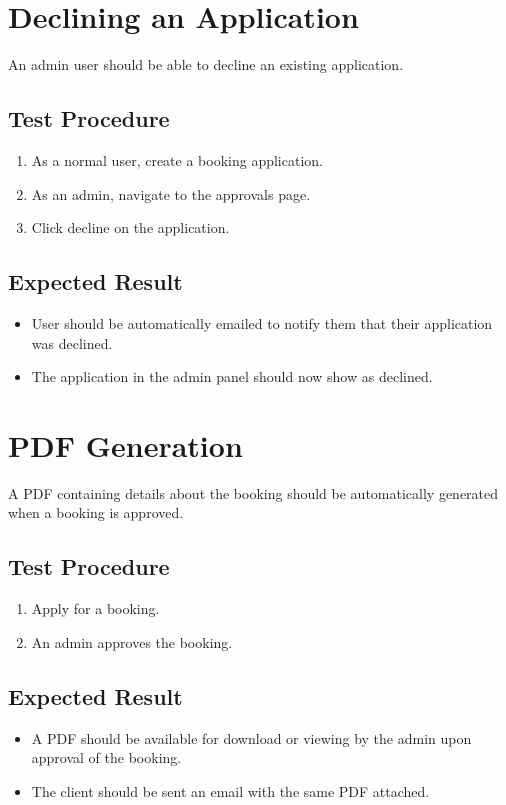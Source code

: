 \documentclass[a4paper, draft]{article}
\begin{document}
\section{Declining an Application}
An admin user should be able to decline an existing application.

\subsection{Test Procedure}
\begin{enumerate}
    \item As a normal user, create a booking application.
    \item As an admin, navigate to the approvals page.
    \item Click decline on the application.
\end{enumerate}

\subsection{Expected Result}
\begin{itemize}
    \item User should be automatically emailed to notify them that their application was declined.
    \item The application in the admin panel should now show as declined.
\end{itemize}

\newpage
\section{PDF Generation} \label{pdf}
A PDF containing details about the booking should be automatically generated when a booking is approved.

\subsection{Test Procedure}
\begin{enumerate}
    \item Apply for a booking.
    \item An admin approves the booking.
\end{enumerate}

\subsection{Expected Result}
\begin{itemize}
    \item A PDF should be available for download or viewing by the admin upon approval of the booking.
    \item The client should be sent an email with the same PDF attached.
\end{itemize}
\end{document}
